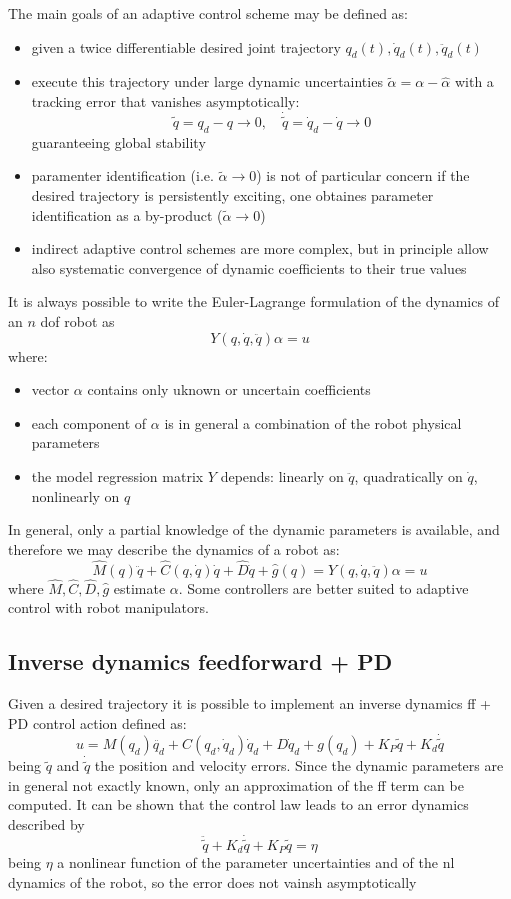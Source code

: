 \documentclass{book}
\begin{document}
The main goals of an adaptive control scheme may be defined as:
\begin{itemize}
    \item given a twice differentiable desired joint trajectory $q_d(t),\dot{q}_d(t),\ddot{q}_d(t)$ 
    \item execute this trajectory under large dynamic uncertainties $\tilde{\alpha}=\alpha-\hat{\alpha}$ with a tracking error that vanishes asymptotically: \[
            \tilde{q}=q_d-q\to 0,\quad \dot{\tilde{q}}=\dot{q}_d-\dot{q}\to 0
    \]
    guaranteeing global stability
    \item paramenter identification (i.e. $\tilde{\alpha}\to 0$) is not of particular concern 
        if the desired trajectory is persistently exciting, one obtaines parameter identification as a by-product ($\tilde{\alpha}\to 0$)
    \item indirect adaptive control schemes are more complex, but in principle allow also systematic convergence of dynamic coefficients to their true values
\end{itemize}
It is always possible to write the Euler-Lagrange formulation of the dynamics of an $n$ dof robot as 
\[
    Y(q,\dot{q},\ddot{q})\alpha = u
\]
where:
\begin{itemize}
    \item vector $\alpha$ contains only uknown or uncertain coefficients
    \item each component of $\alpha$ is in general a combination of the robot physical parameters
    \item the model regression matrix $Y$ depends: linearly on $\ddot{q}$, quadratically on $\dot{q}$, nonlinearly on $q$
\end{itemize}
In general, only a partial knowledge of the dynamic parameters is available, and therefore we may describe the dynamics of a robot as:
\[
    \hat{M}(q)\ddot{q}+\hat{C}(q,\dot{q})\dot{q}+\hat{D}\dot{q}+\hat{g}(q)=Y(q,\dot{q},\ddot{q})\alpha=u
\]
where $\hat{M},\hat{C},\hat{D},\hat{g}$ estimate $\alpha$.
Some controllers are better suited to adaptive control with robot manipulators.
\subsection{Inverse dynamics feedforward + PD}
Given a desired trajectory it is possible to implement an inverse dynamics ff + PD control action defined as:
\[
    u=M(q_d)\ddot{q_d}+C(q_d,\dot{q}_d)\dot{q}_d+D\dot{q}_d+g(q_d)+K_P\tilde{q}+K_d\dot{\tilde{q}}
\]
being $\tilde{q}$ and $\dot{\tilde{q}}$ the position and velocity errors. Since the dynamic parameters are in general not exactly known, only an approximation of the ff term can be computed. It can be shown that the control law leads to an error dynamics described by 
\[
    \ddot{\tilde{q}}+K_d\dot{\tilde{q}}+K_P\tilde{q}=\eta
\]
being $\eta$ a nonlinear function of the parameter uncertainties and of the nl dynamics of the robot, so the error does not vainsh asymptotically
\end{document}
